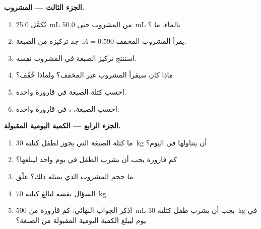 \begin{problem}
\medskip
\noindent\textbf{الجزء الثالث --- المشروب.}
\begin{enumerate}[resume]
  \item يُكمَّل \qty{25.0}{mL} من المشروب حتى \qty{50.0}{mL} بالماء.
        ما ؟
  \item يقرأ المشروب المخفف $A = 0.590$. جد تركيزه من
        الصبغة.
  \item استنتج تركيز الصبغة في المشروب نفسه.
  \item ماذا كان سيقرأ المشروب غير المخفف؟ ولماذا خُفّف؟
  \item احسب كتلة الصبغة في قارورة واحدة.
  \item احسب  الصبغة، ، في قارورة واحدة.
\end{enumerate}

\medskip
\noindent\textbf{الجزء الرابع --- الكمية اليومية المقبولة.}
\begin{enumerate}[resume]
  \item ما كتلة الصبغة التي يجوز لطفل كتلته \qty{30}{kg} أن يتناولها في
        اليوم؟
  \item كم قارورة يجب أن يشرب الطفل في يوم واحد ليبلغها؟
  \item ما حجم المشروب الذي يمثله ذلك؟ علّق.
  \item السؤال نفسه لبالغ كتلته \qty{70}{kg}.
  \item اذكر الجواب النهائي: كم قارورة من \qty{500}{mL} يجب أن يشرب طفل
        كتلته \qty{30}{kg} في يوم ليبلغ الكمية اليومية المقبولة من
        الصبغة؟
\end{enumerate}
\end{problem}
